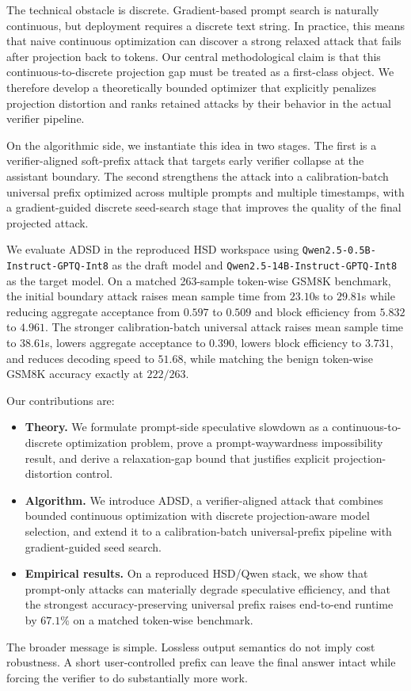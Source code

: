 The technical obstacle is discrete. Gradient-based prompt search is naturally
continuous, but deployment requires a discrete text string. In practice, this
means that naive continuous optimization can discover a strong relaxed attack
that fails after projection back to tokens. Our central methodological claim is
that this continuous-to-discrete projection gap must be treated as a first-class
object. We therefore develop a theoretically bounded optimizer that
explicitly penalizes projection distortion and ranks retained attacks by their
behavior in the actual verifier pipeline.

On the algorithmic side, we instantiate this idea in two stages. The first is
a verifier-aligned soft-prefix attack that targets early verifier collapse at
the assistant boundary. The second strengthens the attack into a
calibration-batch universal prefix optimized across multiple prompts and
multiple timestamps, with a gradient-guided discrete seed-search stage that
improves the quality of the final projected attack.

We evaluate ADSD in the reproduced HSD workspace using
\texttt{Qwen2.5-0.5B-Instruct-GPTQ-Int8} as the draft model and
\texttt{Qwen2.5-14B-Instruct-GPTQ-Int8} as the target model. On a matched
263-sample token-wise GSM8K benchmark, the initial boundary attack raises mean
sample time from $23.10$s to $29.81$s while reducing aggregate acceptance from
$0.597$ to $0.509$ and block efficiency from $5.832$ to $4.961$. The stronger
calibration-batch universal attack raises mean sample time to $38.61$s, lowers
aggregate acceptance to $0.390$, lowers block efficiency to $3.731$, and
reduces decoding speed to $51.68$, while matching the benign token-wise GSM8K
accuracy exactly at $222/263$.

Our contributions are:
\begin{itemize}
\item \textbf{Theory.} We formulate prompt-side speculative slowdown as a
continuous-to-discrete optimization problem, prove a prompt-waywardness
impossibility result, and derive a relaxation-gap bound that justifies
explicit projection-distortion control.
\item \textbf{Algorithm.} We introduce ADSD, a verifier-aligned attack that
combines bounded continuous optimization with discrete projection-aware model
selection, and extend it to a calibration-batch universal-prefix pipeline with
gradient-guided seed search.
\item \textbf{Empirical results.} On a reproduced HSD/Qwen stack, we show that
prompt-only attacks can materially degrade speculative efficiency, and that the
strongest accuracy-preserving universal prefix raises end-to-end runtime by
$67.1\%$ on a matched token-wise benchmark.
\end{itemize}

The broader message is simple. Lossless output semantics do not imply cost
robustness. A short user-controlled prefix can leave the final answer intact
while forcing the verifier to do substantially more work.
